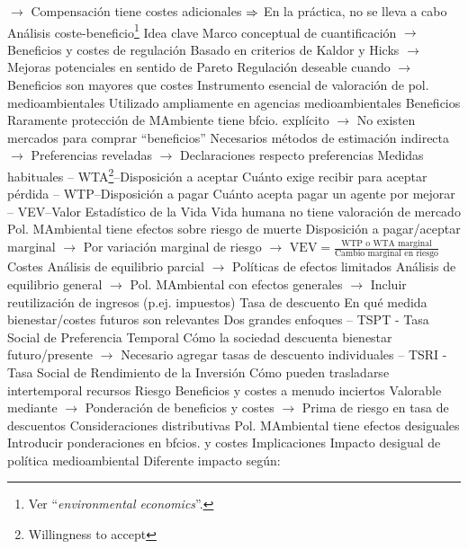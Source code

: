 \documentclass{nuevotema}
\begin{document}
\begin{esquemal}
				\4[] $\to$ Compensación tiene costes adicionales
				\4[] $\Rightarrow$ En la práctica, no se lleva a cabo
			\3 Análisis coste-beneficio\footnote{Ver ``\textit{environmental economics}''.}
				\4 Idea clave
				\4[] Marco conceptual de cuantificación
				\4[] $\to$ Beneficios y costes de regulación
				\4[] Basado en criterios de Kaldor y Hicks
				\4[] $\to$ Mejoras potenciales en sentido de Pareto
				\4[] Regulación deseable cuando
				\4[] $\to$ Beneficios son mayores que costes
				\4[] Instrumento esencial de valoración de pol. medioambientales
				\4[] Utilizado ampliamente en agencias medioambientales
				\4 Beneficios
				\4[] Raramente protección de MAmbiente tiene bfcio. explícito
				\4[] $\to$ No existen mercados para comprar ``beneficios''
				\4[] Necesarios métodos de estimación indirecta
				\4[] $\to$ Preferencias reveladas
				\4[] $\to$ Declaraciones respecto preferencias
				\4[] Medidas habituales
				\4[] -- WTA\footnote{Willingness to accept}--Disposición a aceptar
				\4[] Cuánto exige recibir para aceptar pérdida
				\4[] -- WTP--Disposición a pagar
				\4[] Cuánto acepta pagar un agente por mejorar
				\4[] -- VEV--Valor Estadístico de la Vida
				\4[] Vida humana no tiene valoración de mercado
				\4[] Pol. MAmbiental tiene efectos sobre riesgo de muerte
				\4[] Disposición a pagar/aceptar marginal
				\4[] $\to$ Por variación marginal de riesgo
				\4[] $\to$ $\text{VEV} = \frac{\text{WTP o WTA marginal}}{\text{Cambio marginal en riesgo}}$
				\4 Costes
				\4[] Análisis de equilibrio parcial
				\4[] $\to$ Políticas de efectos limitados
				\4[] Análisis de equilibrio general
				\4[] $\to$ Pol. MAmbiental con efectos generales
				\4[] $\to$ Incluir reutilización de ingresos (p.ej. impuestos)
				\4 Tasa de descuento
				\4[] En qué medida bienestar/costes futuros son relevantes
				\4[] Dos grandes enfoques
				\4[] -- TSPT - Tasa Social de Preferencia Temporal
				\4[] Cómo la sociedad descuenta bienestar futuro/presente
				\4[] $\to$ Necesario agregar tasas de descuento individuales
				\4[] -- TSRI - Tasa Social de Rendimiento de la Inversión
				\4[] Cómo pueden trasladarse intertemporal recursos
				\4 Riesgo
				\4[] Beneficios y costes a menudo inciertos
				\4[] Valorable mediante
				\4[] $\to$ Ponderación de beneficios y costes
				\4[] $\to$ Prima de riesgo en tasa de descuentos
				\4 Consideraciones distributivas
				\4[] Pol. MAmbiental tiene efectos desiguales
				\4[] Introducir ponderaciones en bfcios. y costes
			\3 Implicaciones
				\4 Impacto desigual de política medioambiental
				\4[] Diferente impacto según:

\end{esquemal}
\end{document}
